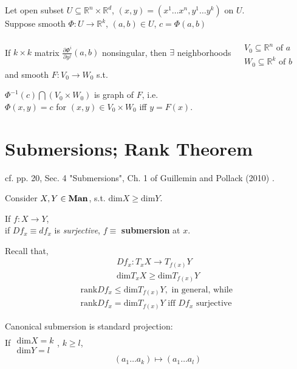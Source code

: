\begin{theorem}
  Let open subset $U\subseteq \mathbb{R}^n \times \mathbb{R}^d$, $(x,y) = (x^1 \dots x^n, y^1 \dots y^k) $ on $U$.  \\
  Suppose smooth $\Phi:U\to \mathbb{R}^k$, $(a,b) \in U$, $c=\Phi(a,b)$

  If $k\times k$ matrix $\frac{ \partial \Phi^i}{ \partial y^j}(a,b)$ nonsingular, then $\exists $ neighborhoods $\begin{aligned} & \quad \\
    & V_0 \subseteq \mathbb{R}^n \text{ of $a$ } \\
    & W_0 \subseteq \mathbb{R}^k \text{ of $b$ } \end{aligned}$ and smooth $F:V_0 \to W_0$ s.t.

  $\Phi^{-1}(c) \bigcap (V_0\times W_0)$ is graph of $F$, i.e. \\
  $\Phi(x,y) =c$ for $(x,y) \in V_0\times W_0$ iff $y=F(x)$.  
  \end{theorem}



\section{Submersions; Rank Theorem} 
cf. pp. 20, Sec. 4 "Submersions", Ch. 1 of Guillemin and Pollack (2010) \cite{dgdt:VGuilleminAPollack2010}.  

Consider $X,Y\in \text{\textbf{Man}}$, s.t. $\text{dim}X \geq \text{dim}Y$.  

\begin{definition}[submersion] If $f:X\to Y$, \\
if $Df_x \equiv df_x$ is \emph{surjective}, $f\equiv $ \textbf{submersion} at $x$.
\end{definition}
Recall that,  
\[
\begin{gathered}
	Df_x:T_xX \to T_{f(x)}Y \\
	\text{dim}T_xX \geq \text{dim}T_{f(x)}Y
\end{gathered}
\]
\[
\begin{gathered}
\text{rank}Df_x \leq \text{dim}T_{f(x)}Y, \text{ in general, while } \\
\text{rank}Df_x = \text{dim}T_{f(x)}Y \text{ iff } Df_x \text{ surjective }
\end{gathered}
\]

Canonical submersion is standard projection: \\
If $\begin{gathered} \quad \\
\text{dim}X = k \\
\text{dim}Y = l \end{gathered}$, $k\geq l$, 
\[
(a_1 \dots a_k ) \mapsto (a_1 \dots a_l)
\]

